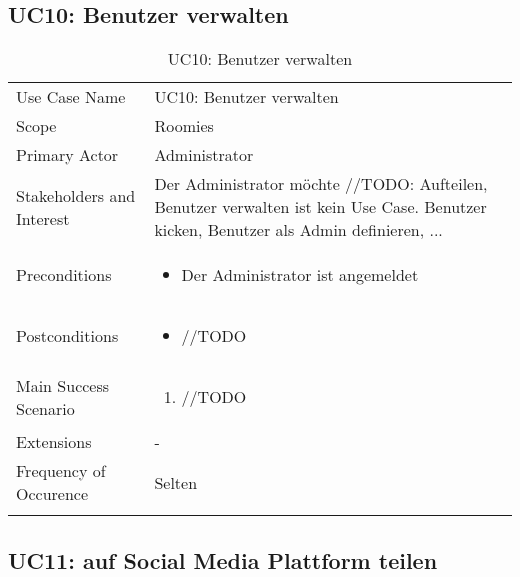 \subsection{UC10: Benutzer verwalten}
\begin{table}[H]
	\tablestyle
	\tablealtcolored
	\begin{tabularx}{\textwidth}{lX}
		\tablebody
			Use Case Name &
			UC10: Benutzer verwalten
			\tabularnewline
			Scope &
			Roomies
			\tabularnewline
			Primary Actor &
			Administrator
			\tabularnewline
			Stakeholders and Interest &
			Der Administrator möchte //TODO: Aufteilen, Benutzer verwalten ist kein Use Case. Benutzer kicken, Benutzer als Admin definieren, ...
			\tabularnewline
			Preconditions &
			\begin{itemize}
				\item Der Administrator ist angemeldet
			\end{itemize}
			\tabularnewline
			Postconditions &
			\begin{itemize}
				\item //TODO
			\end{itemize}
			\tabularnewline
			Main Success Scenario &
			\begin{enumerate}
				\item //TODO
			\end{enumerate}
			\tabularnewline
			Extensions &
			-
			\tabularnewline
			Frequency of Occurence &
			Selten
			\tabularnewline
		\tableend
	\end{tabularx}
	\caption{UC10: Benutzer verwalten}
\end{table}


\subsection{UC11: auf Social Media Plattform teilen}
